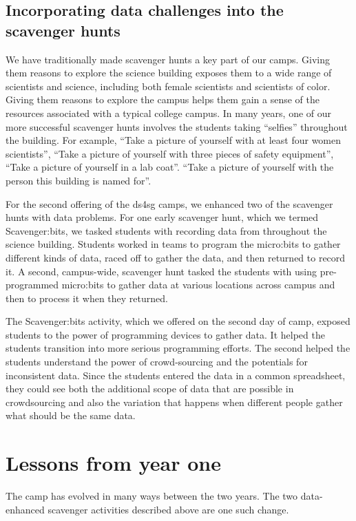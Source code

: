 \subsection{Incorporating data challenges into the scavenger hunts}

We have traditionally made scavenger hunts a key part of our camps.
Giving them reasons to explore the science building exposes them
to a wide range of scientists and science, including both female
scientists and scientists of color.  Giving them reasons to explore
the campus helps them gain a sense of the resources associated with
a typical college campus.  In many years, one of our more successful
scavenger hunts involves the students taking ``selfies'' throughout
the building.  For example, ``Take a picture of yourself with at
least four women scientists'', ``Take a picture of yourself with
three pieces of safety equipment'', ``Take a picture of yourself
in a lab coat''.  ``Take a picture of yourself with the person this
building is named for''.

For the second offering of the ds4sg camps, we enhanced two of the
scavenger hunts with data problems.  For one early scavenger hunt,
which we termed Scavenger:bits, we tasked students with recording
data from throughout the science building.  Students worked in teams
to program the micro:bits to gather different kinds of data, raced
off to gather the data, and then returned to record it.  A second,
campus-wide, scavenger hunt tasked the students with using
pre-programmed micro:bits to gather data at various locations across
campus and then to process it when they returned.

The Scavenger:bits activity, which we offered on the second
day of camp, exposed students to the power of programming devices
to gather data.  It helped the students transition into more serious
programming efforts.  The second helped the students understand the
power of crowd-sourcing and the potentials for inconsistent data.
Since the students entered the data in a common spreadsheet, they could
see both the additional scope of data that are possible in crowdsourcing
and also the variation that happens when different people gather
what should be the same data.

\section{Lessons from year one}

The camp has evolved in many ways between the two years.  The two
data-enhanced scavenger activities described above are one such
change.

